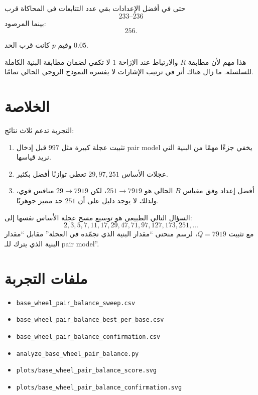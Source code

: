 \documentclass[12pt]{article}
\begin{document}
حتى في أفضل الإعدادات بقي عدد التتابعات في المحاكاة قرب
\[
233\text{--}236
\]
بينما المرصود:
\[
256.
\]

وقيم \(p\) كانت قرب الحد \(0.05\).

هذا مهم لأن مطابقة \(R\) والارتباط عند الإزاحة \(1\) لا تكفي لضمان مطابقة
البنية الكاملة للسلسلة. ما زال هناك أثر في ترتيب الإشارات لا يفسره النموذج
الزوجي الحالي تمامًا.

\section{الخلاصة}

التجربة تدعم ثلاث نتائج:

\begin{enumerate}
\item تثبيت عجلة كبيرة مثل \(997\) قبل إدخال pair model يخفي جزءًا مهمًا من البنية التي نريد قياسها.
\item عجلات الأساس \(29,97,251\) تعطي توازنًا أفضل بكثير.
\item أفضل إعداد وفق مقياس \(B\) الحالي هو \(251\to7919\)، لكن \(29\to7919\) منافس قوي، ولذلك لا يوجد دليل على أن \(251\) حد مميز جوهريًا.
\end{enumerate}

السؤال التالي الطبيعي هو توسيع مسح عجلة الأساس نفسها إلى:
\[
2,3,5,7,11,17,29,47,71,97,127,173,251,\ldots
\]
مع تثبيت \(Q=7919\)، لرسم منحنى ``مقدار البنية الذي نجمّده في العجلة''
مقابل ``مقدار البنية الذي يترك للـ pair model''.

\section{ملفات التجربة}

\begin{itemize}
\item \texttt{base\_wheel\_pair\_balance\_sweep.csv}
\item \texttt{base\_wheel\_pair\_balance\_best\_per\_base.csv}
\item \texttt{base\_wheel\_pair\_balance\_confirmation.csv}
\item \texttt{analyze\_base\_wheel\_pair\_balance.py}
\item \texttt{plots/base\_wheel\_pair\_balance\_score.svg}
\item \texttt{plots/base\_wheel\_pair\_balance\_confirmation.svg}
\end{itemize}
\end{document}
